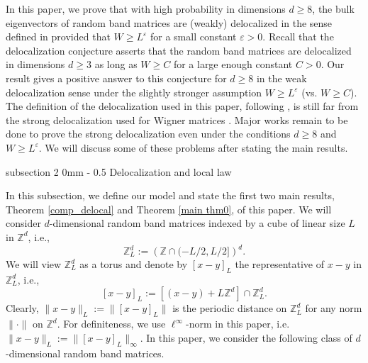 \documentclass{article}
\makeatletter
\newcommand{\1}{\mathds{1}}
\numberwithin{equation}{section}
\newcommand{\be}{\begin{equation}}
\newcommand{\ee}{\end{equation}}
\newcommand{\e}{{\varepsilon}}
\renewcommand{\geq}{\geqslant}
\renewcommand{\ge}{\geq}
\newcommand{\Z}{\mathbb{Z}}
\theoremstyle{plain} %
\theoremstyle{remark}
\renewcommand{\subsection}{\@startsection
{subsection}%
{2}%
{0mm}%
{-\baselineskip}%
{0.5\baselineskip}%
{\normalfont\bf\itshape}} %
\makeatother
\begin{document}
In this paper, we prove that with high probability in dimensions $d\ge 8$, %
the bulk eigenvectors of random band matrices are (weakly) delocalized in the sense defined in \cite{ErdKno2013,ErdKno2011} provided that $W\ge L^\e$ for a small constant $\e>0$. Recall that the delocalization conjecture asserts that the random band matrices are delocalized in dimensions $d \ge 3$ as long as $W\ge C$ for a large enough constant $C>0$. Our result gives a positive answer to  this conjecture for $d \ge 8$  in the weak delocalization sense under the slightly  stronger assumption $W\ge L^\e$ (vs. $W\ge C$). The definition of the delocalization used in this paper, following \cite{ErdKno2013,ErdKno2011}, is still far from the strong delocalization used for Wigner matrices \cite{ESY_local,ESY1}. Major works remain to be done to prove the strong delocalization even under the conditions $d \ge 8$ and $W\ge L^\e$. We will discuss some of these problems after stating the main results. 


 


\subsection{Delocalization and local law}\label{subsec_mainresult}
 
 In this subsection, we define our model and state the first two main results, Theorem \ref{comp_delocal} and Theorem \ref{main thm0}, of this paper. 
 We will consider  $d$-dimensional random band matrices indexed by a cube  of linear size \(L\) in \(\mathbb{Z}^{d} \), i.e., 
 \be\label{ZLd}
 \Z_L^d:=\left( \Z\cap ( -L/2 , L/2]\right) ^d. 
 \ee
 We will view $\Z_L^d$ as a torus and denote  by  $[x-y]_L$ the representative of $x-y$ in $\Z_L^d$, i.e.,  
 \be\label{representativeL}[x-y]_L:= \left[(x-y)+L\Z^d\right]\cap \Z_L^d.\ee
 Clearly, $\|x-y\|_L:=\| [x-y]_L \|$ is  the {periodic} distance on $\Z_L^d$ for any norm $\|\cdot\|$ on $\Z^d$.  For definiteness, we use $\ell^\infty$-norm in this paper, i.e. $\|x-y\|_L:=\|[x-y]_L\|_\infty$. 
 In this paper, we consider the following class of $d$-dimensional random band matrices. 
 
\end{document}
